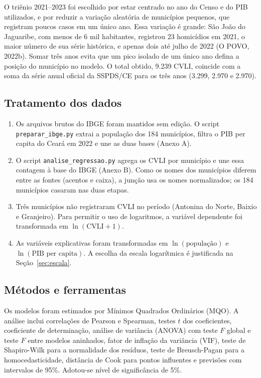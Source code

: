 \documentclass[12pt,a4paper]{article}
\begin{document}
	O triênio 2021--2023 foi escolhido por estar centrado no ano do Censo e do PIB utilizados, e por reduzir a variação aleatória de municípios pequenos, que registram poucos casos em um único ano. Essa variação é grande: São João do Jaguaribe, com menos de 6 mil habitantes, registrou 23 homicídios em 2021, o maior número de sua série histórica, e apenas dois até julho de 2022 (O POVO, 2022b). Somar três anos evita que um pico isolado de um único ano defina a posição do município no modelo. O total obtido, 9.239 CVLI, coincide com a soma da série anual oficial da SSPDS/CE para os três anos (3.299, 2.970 e 2.970).
	
	\subsection{Tratamento dos dados}
	
	\begin{enumerate}
		\item Os arquivos brutos do IBGE foram mantidos sem edição. O script \texttt{preparar\_ibge.py} extrai a população dos 184 municípios, filtra o PIB per capita do Ceará em 2022 e une as duas bases (Anexo A).
		\item O script \texttt{analise\_regressao.py} agrega os CVLI por município e une essa contagem à base do IBGE (Anexo B). Como os nomes dos municípios diferem entre as fontes (acentos e caixa), a junção usa os nomes normalizados; os 184 municípios casaram nas duas etapas.
		\item Três municípios não registraram CVLI no período (Antonina do Norte, Baixio e Granjeiro). Para permitir o uso de logaritmos, a variável dependente foi transformada em $\ln(\text{CVLI}+1)$.
		\item As variáveis explicativas foram transformadas em $\ln(\text{população})$ e $\ln(\text{PIB per capita})$. A escolha da escala logarítmica é justificada na Seção~\ref{sec:escala}.
	\end{enumerate}
	
	\subsection{Métodos e ferramentas}
	
	Os modelos foram estimados por Mínimos Quadrados Ordinários (MQO). A análise inclui correlações de Pearson e Spearman, testes $t$ dos coeficientes, coeficiente de determinação, análise de variância (ANOVA) com teste $F$ global e teste $F$ entre modelos aninhados, fator de inflação da variância (VIF), teste de Shapiro-Wilk para a normalidade dos resíduos, teste de Breusch-Pagan para a homocedasticidade, distância de Cook para pontos influentes e previsões com intervalos de 95\%. Adotou-se nível de significância de 5\%.
	
\end{document}
